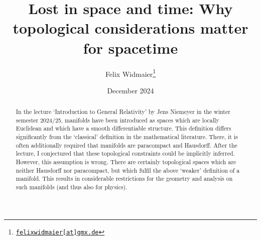 \documentclass[a4paper, 12pt]{article}
\title{\textbf{\textsf{Lost in space and time: Why topological considerations matter for spacetime}}}
\author{Felix Widmaier\thanks{\href{mailto:felixwidmaier [at] gmx.de}{\texttt{felixwidmaier[at]gmx.de}}}}
\date{December 2024}
\theoremstyle{iremark}
\begin{document}
\maketitle
\begin{abstract}
    \noindent In the lecture ‘Introduction to General Relativity’ by Jens Niemeyer in the winter semester 2024/25, manifolds 
    have been introduced as spaces which are locally Euclidean and which have a smooth differentiable structure. 
    This definition differs significantly from the ‘classical’ definition in the mathematical literature. 
    There, it is often additionally required that manifolds are paracompact and Hausdorff. \cite{jost} After the lecture, 
    I conjectured that these topological constraints could be implicitly inferred. However, this assumption is wrong. 
    There are certainly topological spaces which are neither Hausdorff nor paracompact, but which fulfil the above 
    ‘weaker’ definition of a manifold. This results in considerable restrictions for the geometry and analysis on such 
    manifolds (and thus also for physics).
\end{abstract}
\end{document}
